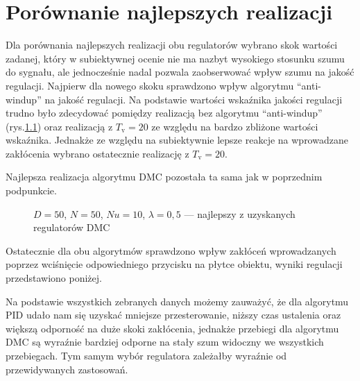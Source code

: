 \chapter{Porównanie najlepszych realizacji}
Dla porównania najlepszych realizacji obu regulatorów wybrano skok wartości zadanej, który w subiektywnej ocenie nie ma nazbyt wysokiego stosunku szumu do sygnału, ale jednocześnie nadal pozwala zaobserwować wpływ szumu na jakość regulacji. Najpierw dla nowego skoku sprawdzono wpływ algorytmu ``anti-windup'' na jakość regulacji. Na podstawie wartości wskaźnika jakości regulacji trudno było zdecydować pomiędzy realizacją bez algorytmu ``anti-windup'' (rys.\ref{PID1}) oraz realizacją z $T_\mathrm{v}=20$ ze względu na bardzo zbliżone wartości wskaźnika. Jednakże ze względu na subiektywnie lepsze reakcje na wprowadzane zakłócenia wybrano ostatecznie realizację z $T_\mathrm{v}=20$.

\begin{figure}[H]
\centering

\label{PID1}
\end{figure}

\begin{figure}[H]
\centering

\label{PID2}
\end{figure}

\begin{figure}[H]
\centering

\label{PID3}
\end{figure}

Najlepsza realizacja algorytmu DMC pozostała ta sama jak w poprzednim podpunkcie.

\begin{figure}[H]
\centering

\caption{$ D = 50 $, $  N = 50 $, $ Nu = 10 $, $ \lambda = 0,5 $ --- najlepszy z uzyskanych regulatorów DMC}
\label{DMC6}
\end{figure}

Ostatecznie dla obu algorytmów sprawdzono wpływ zakłóceń wprowadzanych poprzez wciśnięcie odpowiedniego przycisku na płytce obiektu, wyniki regulacji przedstawiono poniżej.

\begin{figure}[H]
\centering

\label{PIDbest}
\end{figure}

\begin{figure}[H]
\centering

\label{DMCbest}
\end{figure}

Na podstawie wszystkich zebranych danych możemy zauważyć, że dla algorytmu PID udało nam się uzyskać mniejsze przesterowanie, niższy czas ustalenia oraz większą odporność na duże skoki zakłócenia, jednakże przebiegi dla algorytmu DMC są wyraźnie bardziej odporne na stały szum widoczny we wszystkich przebiegach. Tym samym wybór regulatora zależałby wyraźnie od przewidywanych zastosowań.

